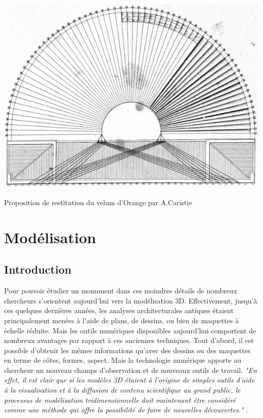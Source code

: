 \begin{figureth}
		\includegraphics[width=\linewidth]{images/velumCaristie}
		\caption[Velum]{Proposition de restitution du velum d'Orange par A.Caristie}
		\label{velumCaristie}
\end{figureth}		















\chapter{Modélisation}
		\minitoc
		\newpage
		
		\section{Introduction}
		Pour pouvoir étudier un monument dans ces moindres détails de nombreux chercheurs s'orientent aujourd'hui vers la modélisation 3D. Effectivement, jusqu'à ces quelques dernières années, les analyses architecturales antiques étaient principalement menées à l'aide de plans, de dessins, ou bien de maquettes à échelle réduite. Mais les outils numériques disponibles aujourd'hui comportent de nombreux avantages par rapport à ces anciennes techniques. Tout d'abord, il est possible d'obtenir les mêmes informations qu'avec des dessins ou des maquettes en terme de côtes, formes, aspect. Mais la technologie numérique apporte au chercheur un nouveau champs d'observation et de nouveaux outils de travail. \textit{"En effet, il est clair que si les modèles 3D étaient à l’origine de simples outils d’aide à la visualisation et à la diffusion de contenu scientifique au grand public, le processus de modélisation tridimensionnelle doit maintenant être considéré comme une méthode qui offre la possibilité de faire de nouvelles découvertes."} \cite{rocheleau}.
		
